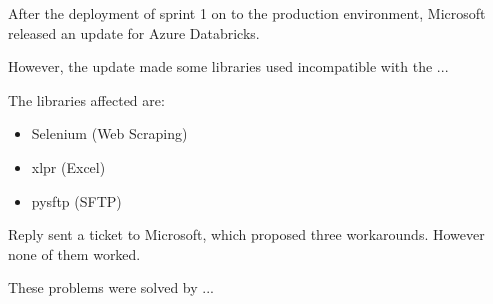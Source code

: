 After the deployment of sprint 1 on to the production environment, Microsoft released an update for Azure Databricks.

However, the update made some libraries used incompatible with the ...

The libraries affected are:
    \begin{itemize}
        \item Selenium (Web Scraping)
        \item xlpr (Excel)
        \item pysftp (SFTP)
    \end{itemize}

Reply sent a ticket to Microsoft, which proposed three workarounds.
However none of them worked.

These problems were solved by ...